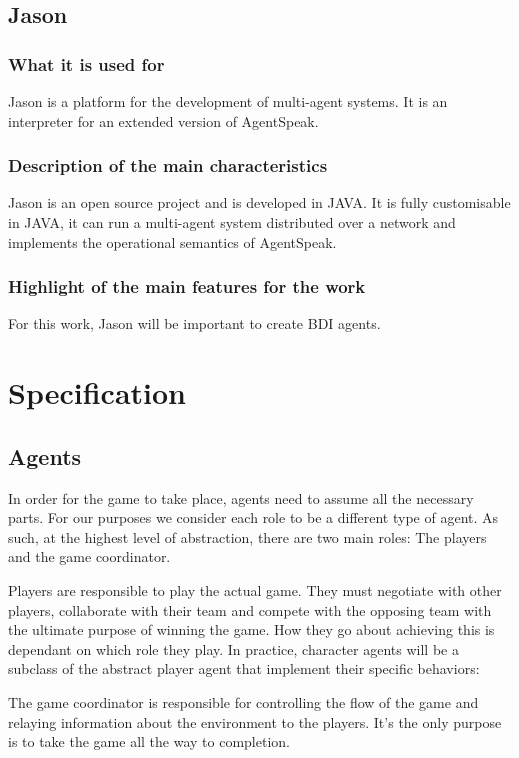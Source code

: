 \documentclass{article}
\begin{document}
\subsection{Jason}
\subsubsection{What it is used for}
Jason is a platform for the development of multi-agent systems. It is an interpreter for an extended version of AgentSpeak.
\subsubsection{Description of the main characteristics}
Jason is an open source project and is developed in JAVA. It is fully customisable in JAVA, it can run a multi-agent system distributed over a network and implements the operational semantics of AgentSpeak.
\subsubsection{Highlight of the main features for the work}
For this work, Jason will be important to create BDI agents. 
\section{Specification}

\subsection{Agents}
In order for the game to take place, agents need to assume all the necessary parts. For our purposes we consider each role to be a different type of agent. As such, at the highest level of abstraction, there are two main roles: The players and the game coordinator.

Players are responsible to play the actual game. They must negotiate with other players, collaborate with their team and compete with the opposing team with the ultimate purpose of winning the game. How they go about achieving this is dependant on which role they play. In practice, character agents will be a subclass of the abstract player agent that implement their specific behaviors:

The game coordinator is responsible for controlling the flow of the game and relaying information about the environment to the players. It's the only purpose is to take the game all the way to completion.
\end{document}
